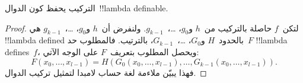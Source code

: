\documentclass[../../../include/open-logic-section]{subfiles}
\begin{document}

\begin{lem}
التركيب يحفظ كون الدوال~!!{lambda definable}.
\end{lem}

\begin{proof}
لتكن~$f$ حاصلة بالتركيب من~$h$ و$g_0$، \dots،~$g_{k-1}$.
ولنفرض أن~$h$ و$g_0$، \dots،~$g_{k-1}$ هي !!{lambda defined}
بالحدود~$H$ و$G_0$، \dots،~$G_{k-1}$، بالترتيب. فالمطلوب حد~$F$
!!{lambda define}s~$f$، ويحصل المطلوب بتعريف~$F$ على الوجه الآتي:
\[
F(x_0, \dots, x_{l-1}) = H(G_0(x_0, \dots, x_{l-1}),
\dots, G_{k-1}(x_0, \dots, x_{l-1})).
\]
فهذا يبيّن ملاءمة لغة حساب لامبدا لتمثيل تركيب الدوال.
\end{proof}
\end{document}
